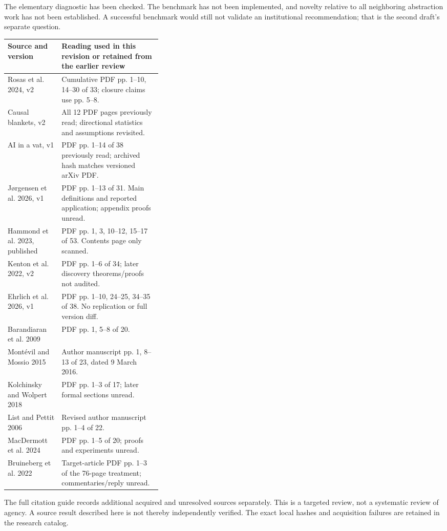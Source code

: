 \documentclass[11pt,letterpaper]{article}
\begin{document}
The elementary diagnostic has been checked. The benchmark has not been implemented, and novelty relative to all neighboring abstraction work has not been established. A successful benchmark would still not validate an institutional recommendation; that is the second draft's separate question.

\small
\begin{tabularx}{\linewidth}{L{0.35\linewidth}Y}\toprule
Source and version & Reading used in this revision or retained from the earlier review \\\midrule
Rosas et al. 2024, v2 & Cumulative PDF pp. 1--10, 14--30 of 33; closure claims use pp. 5--8. \\
Causal blankets, v2 & All 12 PDF pages previously read; directional statistics and assumptions revisited. \\
AI in a vat, v1 & PDF pp. 1--14 of 38 previously read; archived hash matches versioned arXiv PDF. \\
J\o rgensen et al. 2026, v1 & PDF pp. 1--13 of 31. Main definitions and reported application; appendix proofs unread. \\
Hammond et al. 2023, published & PDF pp. 1, 3, 10--12, 15--17 of 53. Contents page only scanned. \\
Kenton et al. 2022, v2 & PDF pp. 1--6 of 34; later discovery theorems/proofs not audited. \\
Ehrlich et al. 2026, v1 & PDF pp. 1--10, 24--25, 34--35 of 38. No replication or full version diff. \\
Barandiaran et al. 2009 & PDF pp. 1, 5--8 of 20. \\
Mont\'evil and Mossio 2015 & Author manuscript pp. 1, 8--13 of 23, dated 9 March 2016. \\
Kolchinsky and Wolpert 2018 & PDF pp. 1--3 of 17; later formal sections unread. \\
List and Pettit 2006 & Revised author manuscript pp. 1--4 of 22. \\
MacDermott et al. 2024 & PDF pp. 1--5 of 20; proofs and experiments unread. \\
Bruineberg et al. 2022 & Target-article PDF pp. 1--3 of the 76-page treatment; commentaries/reply unread. \\\bottomrule
\end{tabularx}
\normalsize

The full citation guide records additional acquired and unresolved sources separately. This is a targeted review, not a systematic review of agency. A source result described here is not thereby independently verified. The exact local hashes and acquisition failures are retained in the research catalog.
\end{document}

